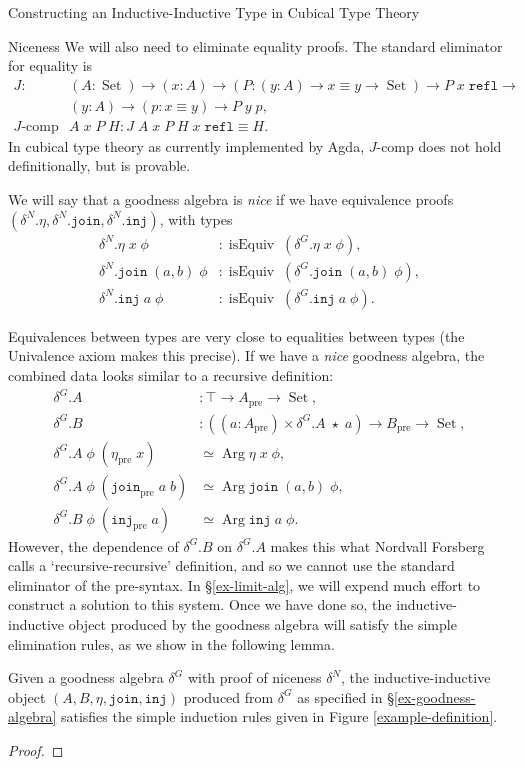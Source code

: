 \documentclass[runningheads]{llncs}
\DeclareMathOperator{\USet}{Set}
\DeclareMathOperator{\isEquiv}{isEquiv}
\DeclareMathOperator{\Arg}{Arg}
\newcommand{\pre}[1]{{#1}_\text{pre}}
\newcommand{\Id}[2]{{#1}\equiv{#2}}
\newcommand{\join}{\texttt{join}}
\newcommand{\inj}{\texttt{inj}}
\newcommand{\refl}{\texttt{refl}}
\def\Forsberg/{Nordvall Forsberg}
\begin{document}
\begin{section}{Constructing an Inductive-Inductive Type in Cubical Type Theory}
\begin{subsection}{Niceness}
{We will also need to eliminate equality proofs. The standard eliminator for equality is \begin{align*}J :&\; (A : \USet) \to (x : A) \to (P : (y : A) \to \Id{x}{y} \to \USet) \to P\;x\;\refl \to\\&\; (y : A) \to (p : \Id{x}{y}) \to P\;y\;p,\\J\text{-comp}&\;A\;x\;P\;H : \Id{J\;A\;x\;P\;H\;x\;\refl}{H}.\end{align*} In cubical type theory as currently implemented by Agda, $J\text{-comp}$ does not hold definitionally, but is provable.
}

We will say that a goodness algebra is \emph{nice} if we have equivalence proofs $(\delta^N.\eta, \delta^N.\join, \delta^N.\inj)$, with types \begin{align*}
\delta^N.\eta\;x\;\phi &: \isEquiv\; (\delta^G.\eta\;x\;\phi),\\
\delta^N.\join\;(a, b)\;\phi &: \isEquiv\; (\delta^G.\join\;(a, b)\;\phi),\\
\delta^N.\inj\;a\;\phi &: \isEquiv\; (\delta^G.\inj\;a\;\phi).
\end{align*}

Equivalences between types are very close to equalities between types (the Univalence axiom makes this precise). If we have a \emph{nice} goodness algebra, the combined data looks similar to a recursive definition:
\begin{align*}
\delta^G.A &: \top \to \pre{A} \to \USet,\\
\delta^G.B &: ((a : \pre{A}) \times \delta^G.A\;\star\;a) \to \pre{B} \to \USet,\\
\delta^G.A\;\phi\;(\pre{\eta}\;x) &\simeq \Arg\eta\;x\;\phi,\\
\delta^G.A\;\phi\;(\pre{\join}\;a\;b) &\simeq \Arg\join\;(a, b)\;\phi,\\
\delta^G.B\;\phi\;(\pre{\inj}\;a) &\simeq \Arg\inj\;a\;\phi.
\end{align*}
However, the dependence of $\delta^G.B$ on $\delta^G.A$ makes this what \Forsberg/ calls a `recursive-recursive' definition, and so we cannot use the standard eliminator of the pre-syntax. In \S\ref{ex-limit-alg}, we will expend much effort to construct a solution to this system. Once we have done so, the inductive-inductive object produced by the goodness algebra will satisfy the simple elimination rules, as we show in the following lemma.

\begin{lemma}
    Given a goodness algebra $\delta^G$ with proof of niceness $\delta^N$, the inductive-inductive object $(A, B, \eta, \join, \inj)$ produced from $\delta^G$ as specified in \S\ref{ex-goodness-algebra} satisfies the simple induction rules given in Figure \ref{example-definition}.
\end{lemma}
\begin{proof}


\end{proof}
\end{subsection}
\end{section}
\end{document}
